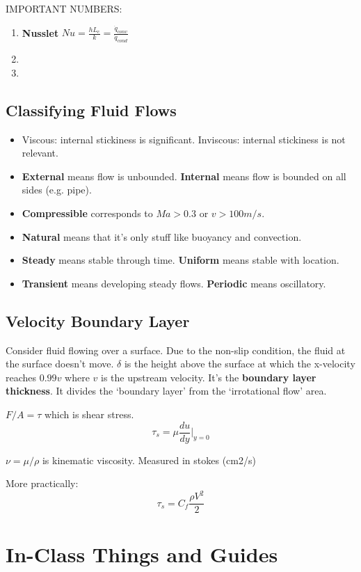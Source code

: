 \documentclass[a4paper,12pt]{report}
\begin{document}
IMPORTANT NUMBERS: 
\begin{enumerate}
\item \textbf{Nusslet} $Nu = \frac{h L_c}{k} = \frac{\dot{q}_{conv}}{\dot{q}_{cond}}$
\item 
\item 
\end{enumerate}

\section{Classifying Fluid Flows}
\begin{itemize}
\item Viscous: internal stickiness is significant. Inviscous: internal stickiness is not relevant. 
\item \textbf{External} means flow is unbounded. \textbf{Internal} means flow is bounded on all sides (e.g. pipe).
\item \textbf{Compressible} corresponds to $Ma > 0.3$ or $v > 100m/s$. 
\item \textbf{Natural} means that it's only stuff like buoyancy and convection.
\item \textbf{Steady} means stable through time. \textbf{Uniform} means stable with location. 
\item \textbf{Transient} means developing steady flows. \textbf{Periodic} means oscillatory.  
\end{itemize}

\section{Velocity Boundary Layer}
Consider fluid flowing over a surface. Due to the non-slip condition, the fluid at the surface doesn't move. 
$\delta$ is the height above the surface at which the x-velocity reaches $0.99v$ where $v$ is the upstream velocity. It's the
\textbf{boundary layer thickness}. It divides the `boundary layer' from the `irrotational flow' area. 

$F/A = \tau$ which is shear stress. $$\tau_s = \mu \frac{du}{dy}|_{y=0}$$

$\nu = \mu/\rho$ is kinematic viscosity. Measured in stokes (cm2/s)

More practically: $$\tau_s = C_f\frac{\rho V^2}{2}$$


\chapter{In-Class Things and Guides}
\end{document}
